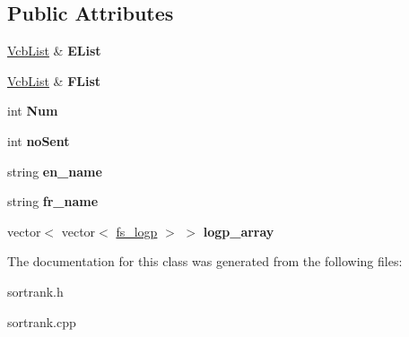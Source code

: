 \subsection*{\-Public \-Attributes}
\begin{DoxyCompactItemize}
\item 
\hypertarget{classSortRank_a78657812f3e9670b20d6d04a789148ea}{\hyperlink{classVcbList}{\-Vcb\-List} \& {\bfseries \-E\-List}}\label{classSortRank_a78657812f3e9670b20d6d04a789148ea}

\item 
\hypertarget{classSortRank_adabc5577d7a7f53f563e2f25bae7559b}{\hyperlink{classVcbList}{\-Vcb\-List} \& {\bfseries \-F\-List}}\label{classSortRank_adabc5577d7a7f53f563e2f25bae7559b}

\item 
\hypertarget{classSortRank_a99940ec3f374e19e6f64d8195cf62628}{int {\bfseries \-Num}}\label{classSortRank_a99940ec3f374e19e6f64d8195cf62628}

\item 
\hypertarget{classSortRank_a7d58d29c5b4cdbd9fb602ab2f2138ed1}{int {\bfseries no\-Sent}}\label{classSortRank_a7d58d29c5b4cdbd9fb602ab2f2138ed1}

\item 
\hypertarget{classSortRank_a83ed15c6177311775107a0d830aba448}{string {\bfseries en\-\_\-name}}\label{classSortRank_a83ed15c6177311775107a0d830aba448}

\item 
\hypertarget{classSortRank_add0c40822261fcf614bac83acc3b412b}{string {\bfseries fr\-\_\-name}}\label{classSortRank_add0c40822261fcf614bac83acc3b412b}

\item 
\hypertarget{classSortRank_a5487560a6ab321d980e5e56c12b91598}{vector$<$ vector$<$ \hyperlink{classfs__logp}{fs\-\_\-logp} $>$ $>$ {\bfseries logp\-\_\-array}}\label{classSortRank_a5487560a6ab321d980e5e56c12b91598}

\end{DoxyCompactItemize}


\-The documentation for this class was generated from the following files\-:\begin{DoxyCompactItemize}
\item 
sortrank.\-h\item 
sortrank.\-cpp\end{DoxyCompactItemize}
